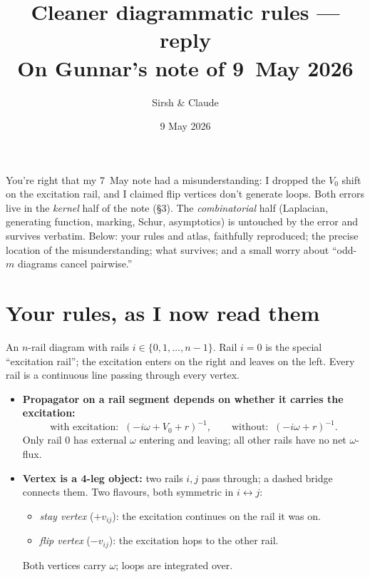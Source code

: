 \documentclass[11pt,a4paper]{article}
\title{\vspace{-1.2cm}Cleaner diagrammatic rules --- reply\\[2pt]
{\large On Gunnar's note of 9~May 2026}}
\author{Sirsh \& Claude}
\date{9 May 2026}
\newcommand{\Gex}{(-i\omega+V_{0}+r)^{-1}}
\newcommand{\Gba}{(-i\omega+r)^{-1}}
\begin{document}
\maketitle

\vspace{-1em}
\begin{commentbox}[title=One-line takeaway]
You're right that my 7~May note had a misunderstanding: I dropped the $V_{0}$
shift on the excitation rail, and I claimed flip vertices don't generate
loops. Both errors live in the \emph{kernel} half of the note (\S 3). The
\emph{combinatorial} half (Laplacian, generating function, marking, Schur,
asymptotics) is untouched by the error and survives verbatim. Below: your
rules and atlas, faithfully reproduced; the precise location of the
misunderstanding; what survives; and a small worry about
``odd-$m$ diagrams cancel pairwise.''
\end{commentbox}

\section{Your rules, as I now read them}

An $n$-rail diagram with rails $i\in\{0,1,\dots,n{-}1\}$. Rail $i{=}0$
is the special ``excitation rail''; the excitation enters on the right
and leaves on the left. Every rail is a continuous line passing through
every vertex.

\begin{itemize}[leftmargin=2em,itemsep=2pt]
\item \textbf{Propagator on a rail segment depends on whether it carries
the excitation:}
\[
\text{with excitation:}\;\;\Gex,\qquad
\text{without:}\;\;\Gba.
\]
Only rail $0$ has external $\omega$ entering and leaving; all other rails
have no net $\omega$-flux.

\item \textbf{Vertex is a 4-leg object:} two rails $i,j$ pass through; a
dashed bridge connects them. Two flavours, both symmetric in $i\leftrightarrow j$:
\begin{itemize}[leftmargin=1.4em,itemsep=1pt]
\item \emph{stay vertex} ($+v_{ij}$): the excitation continues on the rail
it was on.
\item \emph{flip vertex} ($-v_{ij}$): the excitation hops to the other rail.
\end{itemize}
Both vertices carry $\omega$; loops are integrated over.
\end{itemize}
\end{document}
